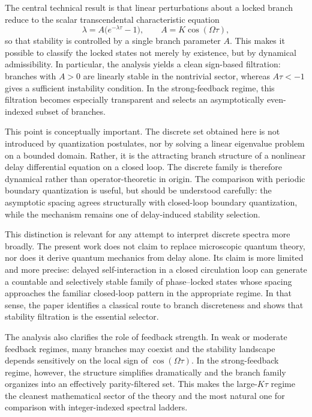 \documentclass[11pt,a4paper]{article}
\begin{document}
    The central technical result is that linear perturbations about a locked branch reduce to the scalar transcendental characteristic equation
    \begin{equation}
        \lambda = A\big(e^{-\lambda\tau}-1\big),
        \qquad
        A=K\cos(\Omega\tau),
    \end{equation}
    so that stability is controlled by a single branch parameter $A$. This makes it possible to classify the locked states not merely by existence, but by dynamical admissibility. In particular, the analysis yields a clean sign-based filtration: branches with $A>0$ are linearly stable in the nontrivial sector, whereas $A\tau<-1$ gives a sufficient instability condition. In the strong-feedback regime, this filtration becomes especially transparent and selects an asymptotically even-indexed subset of branches.
    
    This point is conceptually important. The discrete set obtained here is not introduced by quantization postulates, nor by solving a linear eigenvalue problem on a bounded domain. Rather, it is the attracting branch structure of a nonlinear delay differential equation on a closed loop. The discrete family is therefore dynamical rather than operator-theoretic in origin. The comparison with periodic boundary quantization is useful, but should be understood carefully: the asymptotic spacing agrees structurally with closed-loop boundary quantization, while the mechanism remains one of delay-induced stability selection.
    
    This distinction is relevant for any attempt to interpret discrete spectra more broadly. The present work does not claim to replace microscopic quantum theory, nor does it derive quantum mechanics from delay alone. Its claim is more limited and more precise: delayed self-interaction in a closed circulation loop can generate a countable and selectively stable family of phase--locked states whose spacing approaches the familiar closed-loop pattern in the appropriate regime. In that sense, the paper identifies a classical route to branch discreteness and shows that stability filtration is the essential selector.
    
    The analysis also clarifies the role of feedback strength. In weak or moderate feedback regimes, many branches may coexist and the stability landscape depends sensitively on the local sign of $\cos(\Omega\tau)$. In the strong-feedback regime, however, the structure simplifies dramatically and the branch family organizes into an effectively parity-filtered set. This makes the large-$K\tau$ regime the cleanest mathematical sector of the theory and the most natural one for comparison with integer-indexed spectral ladders.
    
\end{document}
